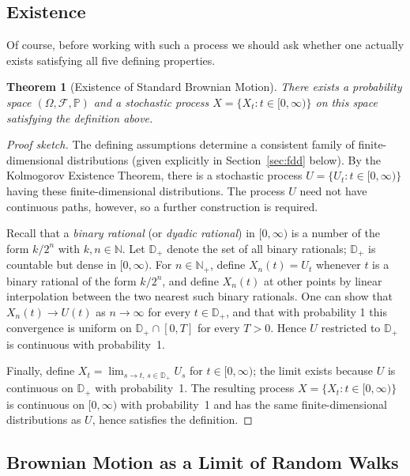 \documentclass[12pt,openany]{book}
\newtheorem{theorem}{Theorem}[section]
\theoremstyle{definition}
\theoremstyle{remark}
\newcommand{\N}{\mathbb{N}}
\newcommand{\Prob}{\mathbb{P}}
\newcommand{\Fscr}{\mathcal{F}}
\begin{document}
\subsection{Existence}
 
Of course, before working with such a process we should ask whether one actually exists satisfying all five defining properties.
 
\begin{theorem}[Existence of Standard Brownian Motion]
There exists a probability space $(\Omega, \Fscr, \Prob)$ and a stochastic process $X = \{X_t : t\in[0,\infty)\}$ on this space satisfying the definition above.
\end{theorem}
 
\begin{proof}[Proof sketch]
The defining assumptions determine a consistent family of finite-dimensional distributions (given explicitly in Section~\ref{sec:fdd} below). By the Kolmogorov Existence Theorem, there is a stochastic process $U = \{U_t : t \in [0,\infty)\}$ having these finite-dimensional distributions. The process $U$ need not have continuous paths, however, so a further construction is required.
 
Recall that a \emph{binary rational} (or \emph{dyadic rational}) in $[0,\infty)$ is a number of the form $k/2^n$ with $k,n\in\N$. Let $\mathbb{D}_+$ denote the set of all binary rationals; $\mathbb{D}_+$ is countable but dense in $[0,\infty)$. For $n \in \N_+$, define $X_n(t) = U_t$ whenever $t$ is a binary rational of the form $k/2^n$, and define $X_n(t)$ at other points by linear interpolation between the two nearest such binary rationals. One can show that $X_n(t) \to U(t)$ as $n\to\infty$ for every $t \in \mathbb{D}_+$, and that with probability 1 this convergence is uniform on $\mathbb{D}_+ \cap [0,T]$ for every $T>0$. Hence $U$ restricted to $\mathbb{D}_+$ is continuous with probability~1.
 
Finally, define $X_t = \lim_{s \to t,\, s \in \mathbb{D}_+} U_s$ for $t \in [0,\infty)$; the limit exists because $U$ is continuous on $\mathbb{D}_+$ with probability~1. The resulting process $X = \{X_t : t\in[0,\infty)\}$ is continuous on $[0,\infty)$ with probability~1 and has the same finite-dimensional distributions as $U$, hence satisfies the definition.
\end{proof}
 
\subsection{Brownian Motion as a Limit of Random Walks}
 
\end{document}
